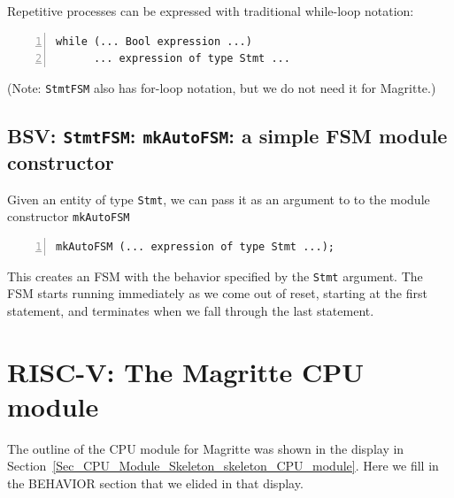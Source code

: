 
Repetitive processes can be expressed with traditional while-loop notation:
\begin{Verbatim}[frame=single, numbers=left]
   while (... Bool expression ...)
      ... expression of type Stmt ...
\end{Verbatim}

(Note: \verb|StmtFSM| also has for-loop notation, but we do not need it for Magritte.)


\subsection{BSV: {\tt StmtFSM}: {\tt mkAutoFSM}: a simple FSM module constructor}


Given an entity of type \verb|Stmt|, we can pass it as an argument to
to the module constructor \verb|mkAutoFSM|

\begin{Verbatim}[frame=single, numbers=left]
   mkAutoFSM (... expression of type Stmt ...);
\end{Verbatim}

This creates an FSM with the behavior specified by the \verb|Stmt|
argument.  The FSM starts running immediately as we come out of reset,
starting at the first statement, and terminates when we fall through
the last statement.


\section{RISC-V: The Magritte CPU module}

\label{Sec_FSMs_Magritte_CPU_module}


The outline of the CPU module for Magritte was shown in the display in
Section~\ref{Sec_CPU_Module_Skeleton_skeleton_CPU_module}.  Here we
fill in the BEHAVIOR section that we elided in that display.

